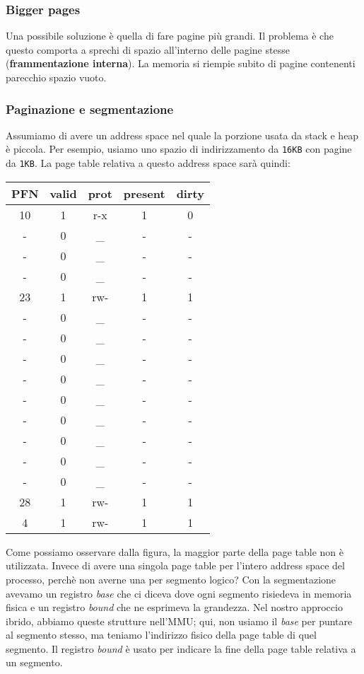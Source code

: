 \documentclass[12pt, twoside, letterpaper]{article}
\begin{document}
			\subsubsection{Bigger pages}
				Una possibile soluzione è quella di fare pagine più grandi. Il problema è che questo comporta a sprechi di spazio all'interno delle pagine stesse (\textbf{frammentazione interna}). La memoria si riempie subito di pagine contenenti parecchio spazio vuoto.
			
			\subsubsection{Paginazione e segmentazione}
				Assumiamo di avere un address space nel quale la porzione usata da stack e heap è piccola. Per esempio, usiamo uno spazio di indirizzamento da \texttt{16KB} con pagine da \texttt{1KB}. La page table relativa a questo address space sarà quindi:
				\begin{center} \begin{tabular}{|c|c|c|c|c|}
					\hline					
					PFN & valid & prot & present & dirty\\
					\hline
					10 & 1 & r-x & 1 & 0\\
					- & 0 & \_ & - & - \\
					- & 0 & \_ & - & - \\
					- & 0 & \_ & - & - \\
					23 & 1 & rw- & 1 & 1\\
					- & 0 & \_ & - & - \\
					- & 0 & \_ & - & - \\
					- & 0 & \_ & - & - \\
					- & 0 & \_ & - & - \\
					- & 0 & \_ & - & - \\
					- & 0 & \_ & - & - \\
					- & 0 & \_ & - & - \\
					- & 0 & \_ & - & - \\
					- & 0 & \_ & - & - \\
					28 & 1 & rw- & 1 & 1\\
					4 & 1 & rw- & 1 & 1\\
					\hline
				\end{tabular} \end{center}
				Come possiamo osservare dalla figura, la maggior parte della page table non è utilizzata.
				Invece di avere una singola page table per l'intero address space del processo, perchè non averne una per segmento logico? Con la segmentazione avevamo un registro \textit{base} che ci diceva dove ogni segmento risiedeva in memoria fisica e un registro \textit{bound} che ne esprimeva la grandezza. Nel nostro approccio ibrido, abbiamo queste strutture nell'MMU; qui, non usiamo il \textit{base} per puntare al segmento stesso, ma teniamo l'indirizzo fisico della page table di quel segmento. Il registro \textit{bound} è usato per indicare la fine della page table relativa a un segmento.\\
\end{document}
